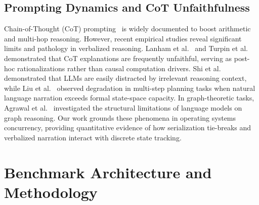 \documentclass[conference]{IEEEtran}
\begin{document}
\subsection{Prompting Dynamics and CoT Unfaithfulness}

Chain-of-Thought (CoT) prompting~\cite{wei2022chain,chu2024survey} is widely documented to boost
arithmetic and multi-hop reasoning. However, recent empirical studies reveal significant
limits and pathology in verbalized reasoning. Lanham et al.~\cite{lanham2023faithfulness}
and Turpin et al.~\cite{turpin2023unfaithful} demonstrated that CoT explanations are
frequently unfaithful, serving as post-hoc rationalizations rather than causal
computation drivers. Shi et al.~\cite{shi2023distracted} demonstrated that LLMs are
easily distracted by irrelevant reasoning context, while Liu et al.~\cite{liu2024mindstep}
observed degradation in multi-step planning tasks when natural language narration exceeds
formal state-space capacity. In graph-theoretic tasks, Agrawal et al.~\cite{agrawal2024graph}
investigated the structural limitations of language models on graph reasoning. Our work
grounds these phenomena in operating systems concurrency, providing quantitative evidence
of how serialization tie-breaks and verbalized narration interact with discrete state tracking.

\section{Benchmark Architecture and Methodology}
\label{sec:benchmark}
\end{document}
